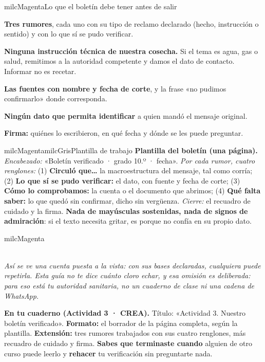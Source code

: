 \documentclass[11pt,letterpaper]{article}
\newcommand{\guiaDiagrama}[2]{%
\begin{center}
\\[1.5mm]
{\footnotesize\itshape\textcolor{milcNegro!75}{#2}}
\end{center}
}
\begin{document}
\begin{drawbox}{milcMagenta}{Lo que el boletín debe tener antes de salir}
\begin{checklista}
\item \textbf{Tres rumores}, cada uno con su tipo de reclamo declarado (hecho, instrucción o sentido) y con lo que sí se pudo verificar.
\item \textbf{Ninguna instrucción técnica de nuestra cosecha.} Si el tema es agua, gas o salud, remitimos a la autoridad competente y damos el dato de contacto. Informar no es recetar.
\item \textbf{Las fuentes con nombre y fecha de corte}, y la frase «no pudimos confirmarlo» donde corresponda.
\item \textbf{Ningún dato que permita identificar} a quien mandó el mensaje original.
\item \textbf{Firma:} quiénes lo escribieron, en qué fecha y dónde se les puede preguntar.
\end{checklista}
\end{drawbox}

\begin{softbox}{milcMagenta}{milcGris}{Plantilla de trabajo}
\textbf{Plantilla del boletín (una página).} \emph{Encabezado:} «Boletín verificado · grado 10.º · fecha». \emph{Por cada rumor, cuatro renglones:} (1) \textbf{Circuló que…} la macroestructura del mensaje, tal como corría; (2) \textbf{Lo que sí se pudo verificar:} el dato, con fuente y fecha de corte; (3) \textbf{Cómo lo comprobamos:} la cuenta o el documento que abrimos; (4) \textbf{Qué falta saber:} lo que quedó sin confirmar, dicho sin vergüenza. \emph{Cierre:} el recuadro de cuidado y la firma. \textbf{Nada de mayúsculas sostenidas, nada de signos de admiración}: si el texto necesita gritar, es porque no confía en su propio dato.
\end{softbox}

\begin{infoband}{milcMagenta}
\guiaDiagrama{assets/10-7/cuenta-del-rumor.tikz}{Así se ve una cuenta puesta a la vista: con sus bases declaradas, cualquiera puede repetirla. Esta guía no te dice cuánto cloro echar, y esa omisión es deliberada: para eso está tu autoridad sanitaria, no un cuaderno de clase ni una cadena de WhatsApp.}

\textbf{En tu cuaderno (Actividad 3 · CREA).} Título: «Actividad 3. Nuestro boletín verificado». \textbf{Formato:} el borrador de la página completa, según la plantilla. \textbf{Extensión:} tres rumores trabajados con sus cuatro renglones, más recuadro de cuidado y firma. \textbf{Sabes que terminaste cuando} alguien de otro curso puede leerlo y \textbf{rehacer} tu verificación sin preguntarte nada.
\end{infoband}
\end{document}
